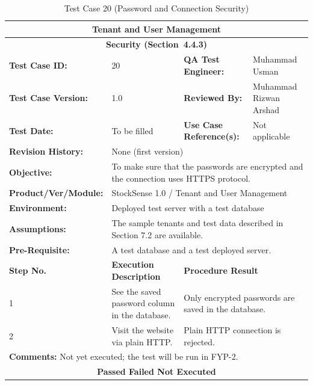 \documentclass{StockSense}
\begin{document}
\begin{table}[!htbp]
\centering
\caption{Test Case 20 (Password and Connection Security)}
{\small\linespread{1}\selectfont\renewcommand{\arraystretch}{1.25}
\begin{tabular}{|p{}|p{}|p{}|p{}|}
\hline
\multicolumn{4}{|c|}{\textbf{Tenant and User Management}} \\ \hline
\multicolumn{4}{|c|}{\textbf{Security (Section~4.4.3)}} \\ \hline
\textbf{Test Case ID:} & 20 & \textbf{QA Test Engineer:} & Muhammad Usman \\ \hline
\textbf{Test Case Version:} & 1.0 & \textbf{Reviewed By:} & Muhammad Rizwan Arshad \\ \hline
\textbf{Test Date:} & To be filled & \textbf{Use Case Reference(s):} & Not applicable \\ \hline
\textbf{Revision History:} & \multicolumn{3}{p{\dimexpr0.70\textwidth+4\tabcolsep\relax}|}{None (first version)} \\ \hline
\textbf{Objective:} & \multicolumn{3}{p{\dimexpr0.70\textwidth+4\tabcolsep\relax}|}{To make sure that the passwords are encrypted and the connection uses HTTPS protocol.} \\ \hline
\textbf{Product/Ver/Module:} & \multicolumn{3}{p{\dimexpr0.70\textwidth+4\tabcolsep\relax}|}{StockSense 1.0 / Tenant and User Management} \\ \hline
\textbf{Environment:} & \multicolumn{3}{p{\dimexpr0.70\textwidth+4\tabcolsep\relax}|}{Deployed test server with a test database} \\ \hline
\textbf{Assumptions:} & \multicolumn{3}{p{\dimexpr0.70\textwidth+4\tabcolsep\relax}|}{The sample tenants and test data described in Section 7.2 are available.} \\ \hline
\textbf{Pre-Requisite:} & \multicolumn{3}{p{\dimexpr0.70\textwidth+4\tabcolsep\relax}|}{A test database and a test deployed server.} \\ \hline
\textbf{Step No.} & \textbf{Execution Description} & \multicolumn{2}{l|}{\textbf{Procedure Result}} \\ \hline
1 & See the saved password column in the database. & \multicolumn{2}{p{\dimexpr0.42\textwidth+2\tabcolsep\relax}|}{Only encrypted passwords are saved in the database.} \\ \hline
2 & Visit the website via plain HTTP. & \multicolumn{2}{p{\dimexpr0.42\textwidth+2\tabcolsep\relax}|}{Plain HTTP connection is rejected.} \\ \hline
\multicolumn{4}{|l|}{\textbf{Comments:} Not yet executed; the test will be run in FYP-2.} \\ \hline
\multicolumn{4}{|c|}{\textbf{Passed \quad Failed \quad Not Executed}} \\ \hline
\end{tabular}\par}
\end{table}
\end{document}
